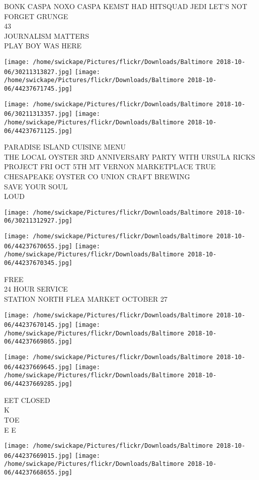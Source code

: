 \documentclass[10pt,letterpaper]{article}
\begin{document}
BONK CASPA NOXO CASPA KEMST HAD HITSQUAD JEDI LET'S NOT FORGET GRUNGE\\
43\\
JOURNALISM MATTERS\\
PLAY BOY WAS HERE
\pagebreak

\texttt{[image: /home/swickape/Pictures/flickr/Downloads/Baltimore 2018-10-06/30211313827.jpg]}
\texttt{[image: /home/swickape/Pictures/flickr/Downloads/Baltimore 2018-10-06/44237671745.jpg]}

\texttt{[image: /home/swickape/Pictures/flickr/Downloads/Baltimore 2018-10-06/30211313357.jpg]}
\texttt{[image: /home/swickape/Pictures/flickr/Downloads/Baltimore 2018-10-06/44237671125.jpg]}

PARADISE ISLAND CUISINE MENU\\
THE LOCAL OYSTER 3RD ANNIVERSARY PARTY WITH URSULA RICKS PROJECT FRI OCT 5TH MT VERNON MARKETPLACE TRUE CHESAPEAKE OYSTER CO UNION CRAFT BREWING\\
SAVE YOUR SOUL\\
LOUD
\pagebreak

\texttt{[image: /home/swickape/Pictures/flickr/Downloads/Baltimore 2018-10-06/30211312927.jpg]}

\vspace{0.25in}
\texttt{[image: /home/swickape/Pictures/flickr/Downloads/Baltimore 2018-10-06/44237670655.jpg]}
\texttt{[image: /home/swickape/Pictures/flickr/Downloads/Baltimore 2018-10-06/44237670345.jpg]}

FREE\\
24 HOUR SERVICE\\
STATION NORTH FLEA MARKET OCTOBER 27
\pagebreak

\texttt{[image: /home/swickape/Pictures/flickr/Downloads/Baltimore 2018-10-06/44237670145.jpg]}
\texttt{[image: /home/swickape/Pictures/flickr/Downloads/Baltimore 2018-10-06/44237669865.jpg]}

\texttt{[image: /home/swickape/Pictures/flickr/Downloads/Baltimore 2018-10-06/44237669645.jpg]}
\texttt{[image: /home/swickape/Pictures/flickr/Downloads/Baltimore 2018-10-06/44237669285.jpg]}

EET CLOSED\\
K\\
TOE\\
E E
\pagebreak

\texttt{[image: /home/swickape/Pictures/flickr/Downloads/Baltimore 2018-10-06/44237669015.jpg]}
\texttt{[image: /home/swickape/Pictures/flickr/Downloads/Baltimore 2018-10-06/44237668655.jpg]}
\end{document}
